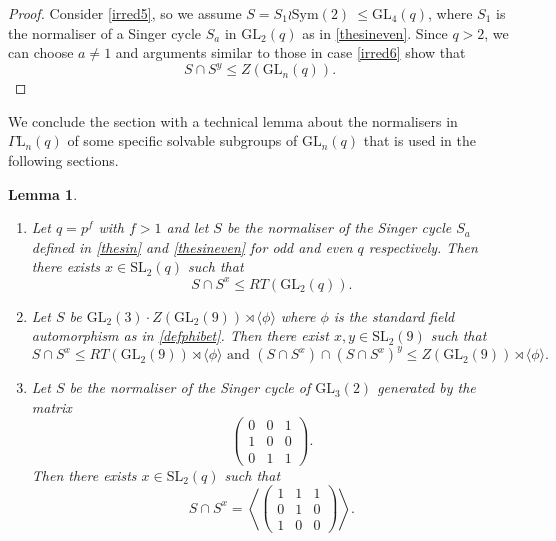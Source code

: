 \documentclass[a4paper,reqno,11pt]{amsart}
\newtheorem{Lem}[Th]{Lemma}
\theoremstyle{definition}
\theoremstyle{remark}
\numberwithin{equation}{section}
\newcommand{\Sym}{\mathrm{Sym}}
\newcommand{\GaL}{{\Gamma \mathrm{L}}}
\newcommand{\SL}{{\mathrm{SL}}}
\newcommand{\GL}{{\mathrm{GL}}}
\begin{document}
\begin{proof}
Consider \ref{irred5},  so we  assume $S=S_1 \wr \Sym(2)\ \le \GL_4(q)$, where $S_1$ is the normaliser of a Singer cycle $S_a$ in $\GL_2(q)$ as in \eqref{thesineven}. Since $q>2$, we can choose $a\ne 1$ and arguments similar to those in case \ref{irred6} show that $$S \cap S^y \le Z(\GL_n(q)).$$ 
\end{proof}

We conclude the section with a technical lemma about the normalisers in $\GaL_n(q)$ of some specific solvable subgroups of $\GL_n(q)$ that is used in the following sections.

\begin{Lem} \label{lemRTdiagfield} \phantom{sdfs}
\begin{enumerate}[font=\normalfont]
\item Let $q=p^f$ with $f>1$ and let $S$ be the normaliser of the Singer cycle $S_a$ defined in \eqref{thesin} and \eqref{thesineven} for odd and even $q$ respectively. Then there exists $x \in \SL_2(q)$ such that $$S \cap S^x \le RT(\GL_2(q)).$$ \label{lrtdf1}
\item Let $S$ be $\GL_2(3) \cdot Z(\GL_2(9)) \rtimes \langle \phi \rangle$ where $\phi$ is the standard field automorphism as in \eqref{defphibet}. Then there exist $x, y \in \SL_2(9)$ such that 
$$S \cap S^x \le RT(\GL_2(9))\rtimes \langle \phi \rangle \text{ and } (S \cap S^x) \cap (S \cap S^x)^y \le Z(\GL_2(9)) \rtimes \langle \phi \rangle.$$ \label{lrtdf2}
\item Let $S$ be the normaliser of the Singer cycle of $\GL_3(2)$ generated by the matrix 
$$ \begin{pmatrix}
0    & 0 & 1  \\
1 &0    & 0  \\
  0&    1    &   1      
\end{pmatrix}.$$ Then there exists $x \in \SL_2(q)$ such that 
$$ S\cap S^x = \left\langle
 \begin{pmatrix}
1    & 1 & 1  \\
0 &1    & 0  \\
  1&    0    &   0      
\end{pmatrix} 
\right\rangle. $$ \label{lrtdf3}
\end{enumerate}
\end{Lem}
\end{document}
